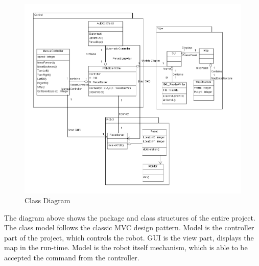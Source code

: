 \documentclass[11pt, a4paper]{report}
\begin{document}
\begin{figure}[h]
  \centering
    \includegraphics[width=16cm]{SEP_13_Class_Diagram.png} 
  \caption{Class Diagram}
\end{figure}
The diagram above shows the package and class structures of the entire project. The class model follows the classic MVC design pattern. Model is the controller part of the project, which controls the robot. GUI is the view part, displays the map in the run-time. Model is the robot itself mechanism, which is able to be accepted the command from the controller. 
\newpage
\end{document}
